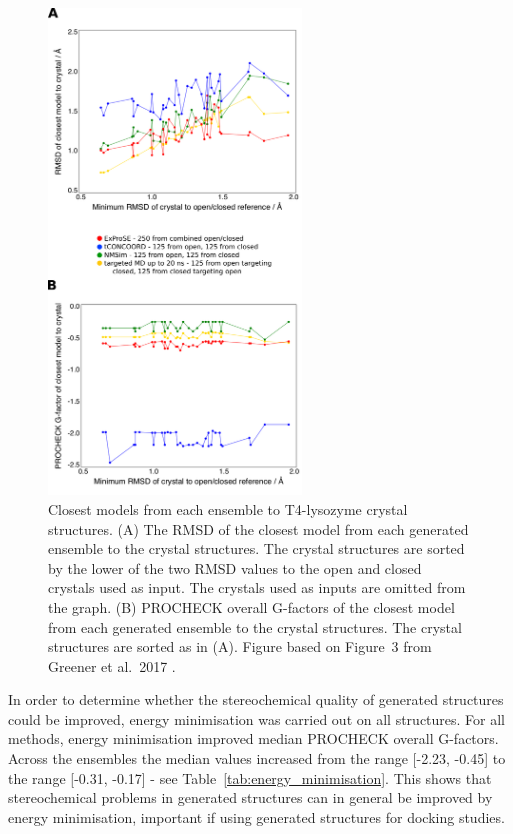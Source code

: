 \begin{figure}
\centering

\includegraphics[width=0.6\textwidth]{figures/t4l_rmsd/t4l_rmsd}

\caption[Closest models from each ensemble to T4-lysozyme crystal structures]
{Closest models from each ensemble to T4-lysozyme crystal structures.
(A) The RMSD of the closest model from each generated ensemble to the crystal structures.
The crystal structures are sorted by the lower of the two RMSD values to the open and closed crystals used as input.
The crystals used as inputs are omitted from the graph.
(B) PROCHECK overall G-factors of the closest model from each generated ensemble to the crystal structures.
The crystal structures are sorted as in (A).
Figure based on Figure~3 from Greener et al.\ 2017 \cite{Greener2017}.}

\label{fig:t4l_rmsd}
\end{figure}


In order to determine whether the stereochemical quality of generated structures could be improved, energy minimisation was carried out on all structures.
For all methods, energy minimisation improved median PROCHECK overall G-factors.
Across the ensembles the median values increased from the range [-2.23, -0.45] to the range [-0.31, -0.17] - see Table~\ref{tab:energy_minimisation}.
This shows that stereochemical problems in generated structures can in general be improved by energy minimisation, important if using generated structures for docking studies.


